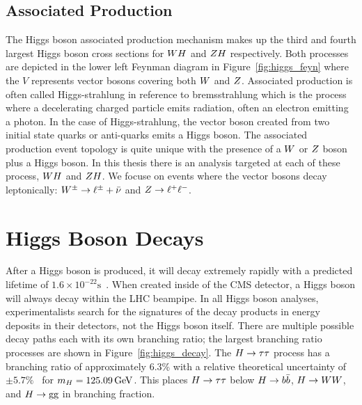 \subsection{Associated Production}
The Higgs boson associated production mechanism makes up the third and fourth largest
Higgs boson cross sections for $WH$ and $ZH$ respectively. Both processes are 
depicted in the lower left Feynman diagram in Figure~\ref{fig:higgs_feyn} where
the $V$ represents vector bosons covering both $W$ and $Z$. Associated
production is often called Higgs-strahlung in reference to bremsstrahlung which is the
process where a decelerating charged particle emits radiation, often an electron
emitting a photon. In the case of Higgs-strahlung, the vector boson created 
from two initial state quarks or anti-quarks emits a Higgs boson. The associated
production event topology is quite unique with the presence of a $W$ or $Z$
boson plus a Higgs boson. In this thesis there is an analysis targeted at each
of these process, $WH$ and $ZH$. We focuse on events where the vector
bosons decay leptonically: $W^{\pm} \to \ell^{\pm} + \bar{\nu}$ and $Z \to \ell^{+}\ell^{-}$.



\section{Higgs Boson Decays}
\label{sec:higgs_decays}
After a Higgs boson is produced, it will decay extremely rapidly with a predicted lifetime
of $1.6 \times 10^{-22}\text{s}$~\cite{Dittmaier:2012vm}. When created
inside of the CMS detector, a Higgs boson will always decay
within the LHC beampipe. In all Higgs boson analyses, experimentalists search for the
signatures of the decay products in energy deposits in their detectors, not the Higgs
boson itself. There are multiple possible decay
paths each with its own branching ratio; the largest branching ratio
processes are shown in Figure~\ref{fig:higgs_decay}. The $H\to\tau\tau$ process has a branching
ratio of approximately 6.3\% with a relative theoretical uncertainty of 
$\pm5.7\%$~\cite{deFlorian:2016spz} for $m_{H} = 125.09\,\mathrm{GeV}$. This places $H\to\tau\tau$ below $H\to b\bar{b}$, 
$H\to WW$, and $H\to\text{g}\text{g}$ in branching fraction.

